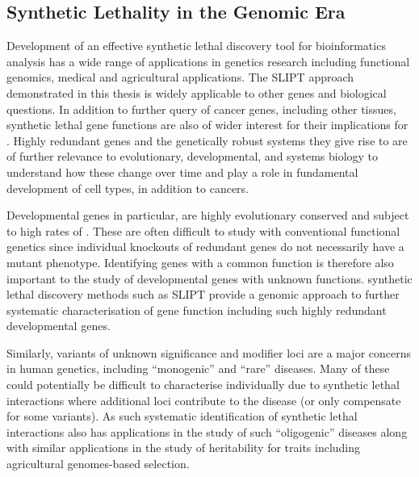 \subsection{Synthetic Lethality in the Genomic Era}
\label{chapt6:significance_genetics}

Development of an effective \gls{synthetic lethal} discovery tool for \gls{bioinformatics} analysis has a wide range of applications in genetics research including functional \glspl{genomic}, medical and agricultural applications.  The \gls{SLIPT} approach demonstrated in this thesis is widely applicable to other genes and biological questions. In addition to further query of cancer genes, including other tissues, \gls{synthetic lethal} gene functions are also of wider interest for their implications for . Highly redundant genes and the genetically robust systems they give rise to are of further relevance to evolutionary, developmental, and systems biology to understand how these change over time and play a role in fundamental development of cell types, in addition to cancers.

Developmental genes in particular, are highly evolutionary conserved and subject to high rates of . These are often difficult to study with conventional functional genetics since individual knockouts of redundant genes do not necessarily have a \gls{mutant} phenotype. Identifying genes with a common function is therefore also important to the study of developmental genes with unknown functions. \Gls{synthetic lethal} discovery methods such as \gls{SLIPT} provide a \gls{genomic} approach to further systematic characterisation of gene function including such highly redundant developmental genes.

Similarly, variants of unknown significance and modifier loci are a major concerns in human genetics, including ``monogenic'' and ``rare'' diseases. Many of these could potentially be difficult to characterise individually due to \gls{synthetic lethal} interactions where additional loci contribute to the disease (or only compensate for some variants). As such systematic identification of \gls{synthetic lethal} interactions also has applications in the study of such ``oligogenic'' diseases along with similar applications in the study of heritability for traits including agricultural \glspl{genome}-based selection.

